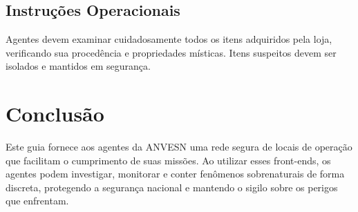\documentclass{book}
\begin{document}
\section{Instruções Operacionais}
Agentes devem examinar cuidadosamente todos os itens adquiridos pela loja, verificando sua procedência e propriedades místicas. Itens suspeitos devem ser isolados e mantidos em segurança.

\backmatter
\chapter*{Conclusão}
Este guia fornece aos agentes da ANVESN uma rede segura de locais de operação que facilitam o cumprimento de suas missões. Ao utilizar esses front-ends, os agentes podem investigar, monitorar e conter fenômenos sobrenaturais de forma discreta, protegendo a segurança nacional e mantendo o sigilo sobre os perigos que enfrentam.
\end{document}
